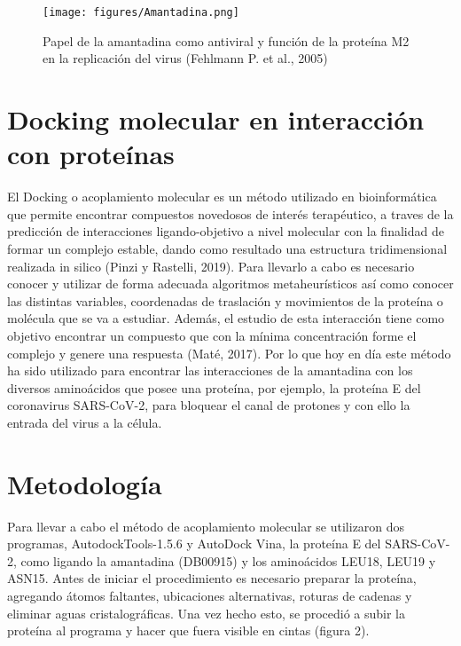 \documentclass[12pt]{article}
\begin{document}
	\begin{figure}[!ht]
 \centering
 \texttt{[image: figures/Amantadina.png]}
 \caption{Papel de la amantadina como antiviral y función de la proteína M2 en la replicación del virus (Fehlmann P. et al., 2005)}
 \label{fig:exemplo}
\end{figure}
	
	\section{Docking molecular en interacción con proteínas}
	\label{sec:fund_teorica}
	
	El Docking o acoplamiento molecular es un método utilizado en bioinformática que permite encontrar compuestos novedosos de interés terapéutico, a traves de la predicción de interacciones ligando-objetivo a nivel molecular con la finalidad de formar un complejo estable, dando como resultado una estructura tridimensional realizada in silico (Pinzi y Rastelli, 2019). Para llevarlo a cabo es necesario conocer y utilizar de forma adecuada algoritmos metaheurísticos así como conocer las distintas variables, coordenadas de traslación y movimientos de la proteína o molécula que se va a estudiar. Además, el estudio de esta interacción tiene como objetivo encontrar un compuesto que con la mínima concentración forme el complejo y genere una respuesta (Maté, 2017). Por lo que hoy en día este método ha sido utilizado para encontrar las interacciones de la amantadina con los diversos aminoácidos que posee una proteína, por ejemplo, la proteína E del coronavirus SARS-CoV-2, para bloquear el canal de protones y con ello la entrada del virus a la célula.
	
	
	
	\section{Metodología}
	\label{sec:metodologia}
	
	Para llevar a cabo el método de acoplamiento molecular se utilizaron dos programas, AutodockTools-1.5.6 y AutoDock Vina, la proteína E del SARS-CoV-2, como ligando la amantadina (DB00915) y los aminoácidos LEU18, LEU19 y ASN15. Antes de iniciar el procedimiento es necesario preparar la proteína, agregando átomos faltantes, ubicaciones alternativas, roturas de cadenas y eliminar aguas cristalográficas. Una vez hecho esto, se procedió a subir la proteína al programa y hacer que fuera visible en cintas (figura 2). 
	
\end{document}

